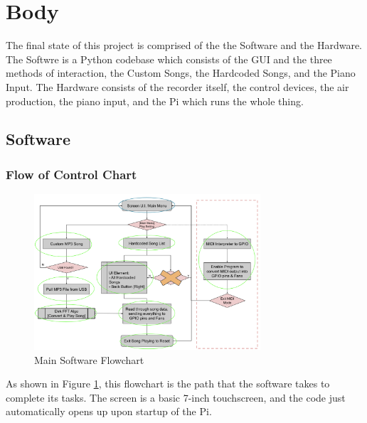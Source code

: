 \documentclass[UTF8, 12pt]{article}
\begin{document}
\newpage
\section{Body}
    The final state of this project is comprised of the the Software and the Hardware. The Softwre is a Python codebase which consists of the GUI and the three methods of interaction, the Custom Songs, the Hardcoded Songs, and the Piano Input. The Hardware consists of the recorder itself, the control devices, the air production, the piano input, and the Pi which runs the whole thing.

\subsection{Software}
\subsubsection{Flow of Control Chart}
    \begin{figure}[h]
        \centering
        \includegraphics[width=0.75\textwidth]{flowchart}
        \caption{Main Software Flowchart}
        \label{fc}
    \end{figure}
    As shown in Figure \ref{fc}, this flowchart is the path that the software takes to complete its tasks. The screen is a basic 7-inch touchscreen, and the code just automatically opens up upon startup of the Pi. 
\end{document}
